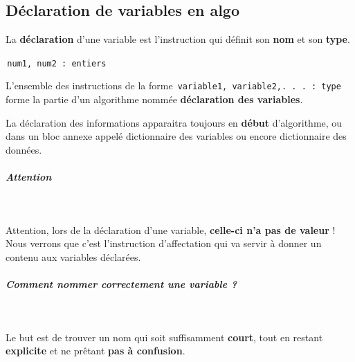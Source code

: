 \documentclass[11pt,a4paper]{article}
\begin{document}
				\subsection{D\'eclaration de variables en algo}
          La \textbf{d\'eclaration} d'une variable est l'instruction qui d\'efinit son \textbf{nom} 
          et son \textbf{type}.
        
            \par
        \,\verb|num1, num2 : entiers|\,
            \par
        
          L'ensemble des instructions de la forme \,\verb|variable1, variable2,. . . : type|\,
          forme la partie d'un algorithme nomm\'ee \textbf{d\'eclaration des variables}. 
        
            \par
        
          La d\'eclaration des informations apparaitra toujours en \textbf{d\'ebut} d'algorithme, ou dans un bloc annexe appel\'e
          dictionnaire des variables ou encore dictionnaire des donn\'ees.
        
            \par
        
			
		\subparagraph{Attention} 
		
					\textcolor{white}{.} \par
				
            \par
        
          Attention, lors de la d\'eclaration d'une variable, \textbf{celle-ci n'a pas de valeur} ! 
          Nous verrons que c'est l'instruction d'affectation qui va servir \`a donner un contenu aux variables d\'eclar\'ees.
        
            \par
        
			
		\subparagraph{Comment nommer correctement une variable ?} 
		
					\textcolor{white}{.} \par
				
            \par
        
          Le but est de trouver un nom qui soit suffisamment \textbf{court}, 
          tout en restant \textbf{explicite} et ne pr\^etant \textbf{pas \`a confusion}.
        
            \par
        
\end{document}

